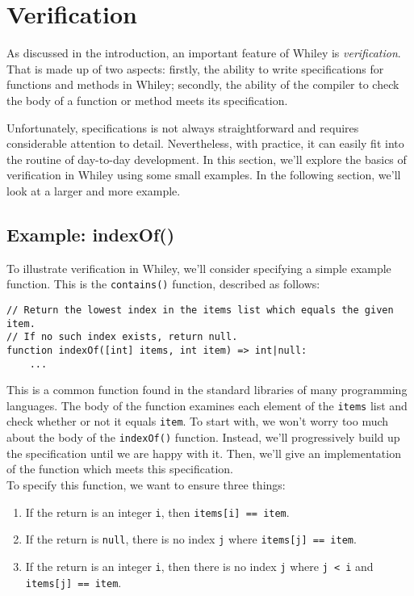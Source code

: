 \newpage
\section{Verification}

As discussed in the introduction, an important feature of Whiley is
{\em verification}.  That is made up of two aspects: firstly, the
ability to write specifications for functions and methods in Whiley;
secondly, the ability of the compiler to check the body of a function
or method meets its specification.

Unfortunately, specifications is not always straightforward and
requires considerable attention to detail.  Nevertheless, with
practice, it can easily fit into the routine of day-to-day
development.  In this section, we'll explore the basics of
verification in Whiley using some small examples.  In the following
section, we'll look at a larger and more example.

\subsection{Example: indexOf()} 
To illustrate verification in Whiley, we'll consider specifying a
simple example function.  This is the \lstinline{contains()} function,
described as follows:

\begin{lstlisting}
// Return the lowest index in the items list which equals the given item.
// If no such index exists, return null.
function indexOf([int] items, int item) => int|null:
    ...
\end{lstlisting}

This is a common function found in the standard libraries of many
programming languages.  The body of the function examines each element
of the \lstinline{items} list and check whether or not it equals
\lstinline{item}.  To start with, we won't worry too much about the
body of the \lstinline{indexOf()} function.  Instead, we'll
progressively build up the specification until we are happy with it.
Then, we'll give an implementation of the function which meets this
specification.\\

\noindent To specify this function, we want to ensure three things:

\begin{enumerate}
\item If the return is an integer \lstinline{i}, then
  \lstinline{items[i] == item}.
\item If the return is \lstinline{null}, there is no index
  \lstinline{j} where \lstinline{items[j] == item}.
\item If the return is an integer \lstinline{i}, then there is
  no index \lstinline{j} where \lstinline{j < i} and
  \lstinline{items[j] == item}.
\end{enumerate}

